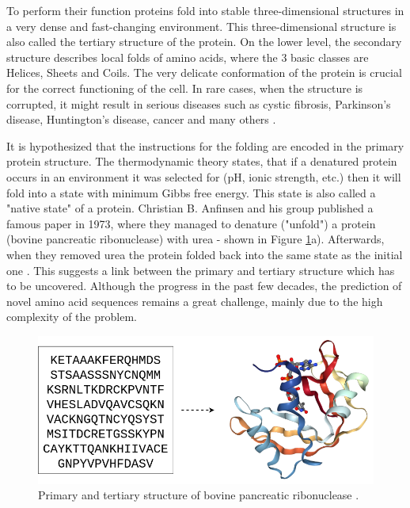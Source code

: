 To perform their function proteins fold into stable three-dimensional structures in a very dense and fast-changing environment.
This three-dimensional structure is also called the tertiary structure of the protein. 
On the lower level, the secondary structure describes local folds of amino acids, where the 3 basic classes are Helices, Sheets and Coils.
The very delicate conformation of the protein is crucial for the correct functioning of the cell.
In rare cases, when the structure is corrupted, it might result in serious diseases such as cystic fibrosis, Parkinson's disease, Huntington's disease, cancer and many others \cite{protein_misfolding_diseases}.

It is hypothesized that the instructions for the folding are encoded in the primary protein structure. 
The thermodynamic theory states, that if a denatured protein occurs in an environment it was selected for (pH, ionic strength, etc.) then it will fold into a state with minimum Gibbs free energy.
This state is also called a "native state" of a protein. 
Christian B. Anfinsen and his group published a famous paper in 1973, where they managed to denature ("unfold") a protein (bovine pancreatic ribonuclease) with urea - shown in Figure \ref{fig:primarytertiary}a). 
Afterwards, when they removed urea the protein folded back into the same state as the initial one \cite{anfinsen}. 
This suggests a link between the primary and tertiary structure which has to be uncovered. 
Although the progress in the past few decades, the prediction of novel amino acid sequences remains a great challenge, mainly due to the high complexity of the problem.

\begin{figure}[b!]
    \centering
    \includegraphics[width=\linewidth]{imgs_tomas/bopaen2.png}
    \caption{Primary and tertiary structure of bovine pancreatic ribonuclease \cite{pdb}.}
    \label{fig:primarytertiary}
\end{figure}

